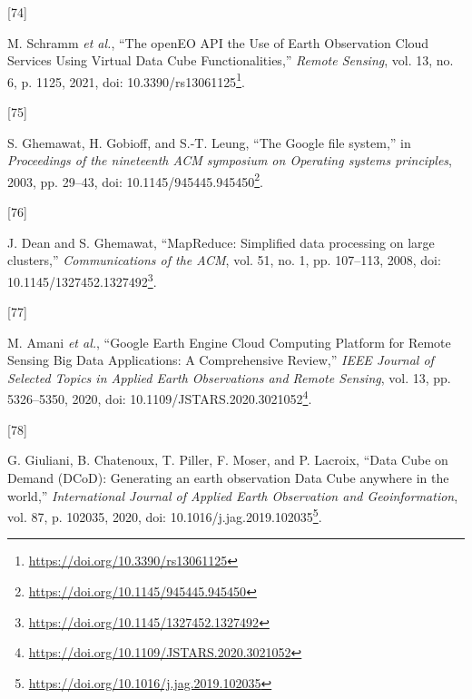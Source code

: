 \documentclass[
  11pt,
]{report}
\newlength{\cslhangindent}
\newlength{\csllabelwidth}
\newlength{\cslentryspacingunit} %
\newenvironment{CSLReferences}[2] %
 {%
  \setlength{\parindent}{0pt}
  \ifodd #1
  \let\oldpar\par
  \def\par{\hangindent=\cslhangindent\oldpar}
  \fi
  \setlength{\parskip}{#2\cslentryspacingunit}
 }%
 {}
\newcommand{\CSLLeftMargin}[1]{\parbox[t]{\csllabelwidth}{#1}}
\newcommand{\CSLRightInline}[1]{\parbox[t]{\linewidth - \csllabelwidth}{#1}\break}
\renewcommand{\href}[2]{#2\footnote{\url{#1}}}
\begin{document}
\begin{CSLReferences}{0}{0}
\leavevmode{}%
\CSLLeftMargin{{[}74{]} }%
\CSLRightInline{M. Schramm \emph{et al.}, {``The {openEO
API}\textendash{{Harmonising}} the {Use} of {Earth Observation Cloud
Services Using Virtual Data Cube Functionalities},''} \emph{Remote
Sensing}, vol. 13, no. 6, p. 1125, 2021, doi:
\href{https://doi.org/10.3390/rs13061125}{10.3390/rs13061125}.}

\leavevmode{}%
\CSLLeftMargin{{[}75{]} }%
\CSLRightInline{S. Ghemawat, H. Gobioff, and S.-T. Leung, {``The
{Google} file system,''} in \emph{Proceedings of the nineteenth {ACM}
symposium on {Operating} systems principles}, 2003, pp. 29--43, doi:
\href{https://doi.org/10.1145/945445.945450}{10.1145/945445.945450}.}

\leavevmode{}%
\CSLLeftMargin{{[}76{]} }%
\CSLRightInline{J. Dean and S. Ghemawat, {``{MapReduce}: Simplified data
processing on large clusters,''} \emph{Communications of the ACM}, vol.
51, no. 1, pp. 107--113, 2008, doi:
\href{https://doi.org/10.1145/1327452.1327492}{10.1145/1327452.1327492}.}

\leavevmode{}%
\CSLLeftMargin{{[}77{]} }%
\CSLRightInline{M. Amani \emph{et al.}, {``Google {Earth Engine Cloud
Computing Platform} for {Remote Sensing Big Data Applications}: {A
Comprehensive Review},''} \emph{IEEE Journal of Selected Topics in
Applied Earth Observations and Remote Sensing}, vol. 13, pp. 5326--5350,
2020, doi:
\href{https://doi.org/10.1109/JSTARS.2020.3021052}{10.1109/JSTARS.2020.3021052}.}

\leavevmode{}%
\CSLLeftMargin{{[}78{]} }%
\CSLRightInline{G. Giuliani, B. Chatenoux, T. Piller, F. Moser, and P.
Lacroix, {``Data {Cube} on {Demand} ({DCoD}): {Generating} an earth
observation {Data Cube} anywhere in the world,''} \emph{International
Journal of Applied Earth Observation and Geoinformation}, vol. 87, p.
102035, 2020, doi:
\href{https://doi.org/10.1016/j.jag.2019.102035}{10.1016/j.jag.2019.102035}.}

\end{CSLReferences}

\printindex
\end{document}
